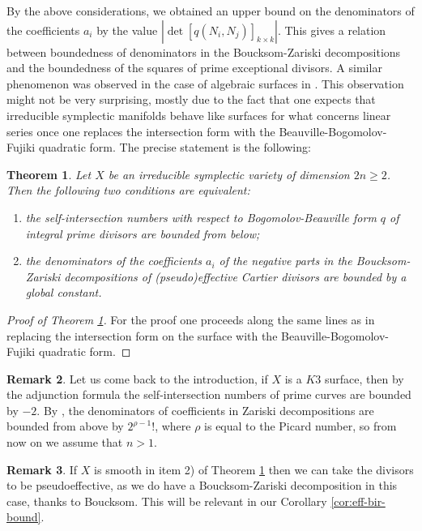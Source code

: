 \documentclass[12pt,reqno]{amsart}
\newtheorem{thm}{Theorem}[section]
\theoremstyle{plain}
\theoremstyle{definition}
\newtheorem{remark}[thm]{Remark}
\begin{document}
 By the above considerations, we obtained an upper bound on the denominators of the coefficients $a_{i}$ by the value $ | \det [q(N_{i},N_{j})]_{k \times k} |$. This gives a relation between boundedness of denominators in the Boucksom-Zariski decompositions and the boundedness of the squares of prime exceptional divisors.  A similar phenomenon was observed in the case of algebraic surfaces in \cite{BPS17}. This observation might not be very surprising, mostly due to the fact that one expects that irreducible symplectic  manifolds behave like surfaces for what concerns linear series once one replaces the intersection form with the Beauville-Bogomolov-Fujiki quadratic form.
The precise statement is the following:
\begin{thm}\label{ZariskiBNC}
Let $X$ be an irreducible symplectic variety of dimension $2n\geq 2$.
 Then the following two conditions are equivalent:
\begin{enumerate}
    \item[1)] the self-intersection numbers with respect to Bogomolov-Beauville form $q$ of integral prime divisors are bounded from below;
    \item[2)] the denominators of the coefficients $a_{i}$ of the negative parts in the Boucksom-Zariski decompositions of (pseudo)effective Cartier divisors are bounded by a global constant.

\end{enumerate}
\end{thm}


\begin{proof}[Proof of Theorem \ref{ZariskiBNC}]
For the proof one proceeds along the same lines as in \cite{BPS17} replacing the intersection form on the surface with the Beauville-Bogomolov-Fujiki quadratic form.
\end{proof}


\begin{remark}
Let us come back to the introduction, if $X$ is a $K3$ surface, then by the adjunction formula the self-intersection numbers of prime curves are bounded by $-2$. By \cite[Example 3.2]{BPS17}, the denominators of coefficients in Zariski decompositions are bounded from above by $2^{\rho - 1}!$, where $\rho$ is equal to the Picard number, so from now on we assume that $n>1$.
\end{remark}

\begin{remark}
If $X$ is smooth in item 2) of Theorem \ref{ZariskiBNC} then we can take the divisors to be pseudoeffective, as we do have a Boucksom-Zariski decomposition in this case, thanks to Boucksom. This will be relevant in our Corollary \ref{cor:eff-bir-bound}.
\end{remark}
\end{document}
